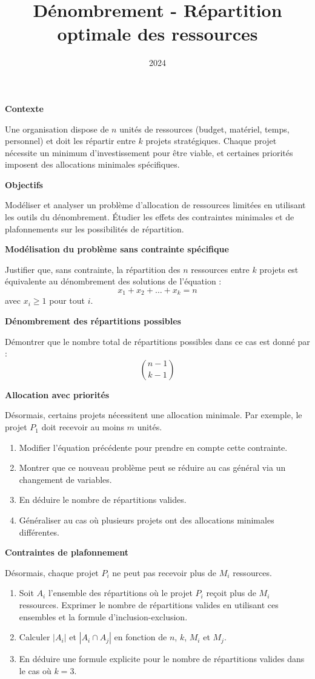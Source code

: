 \documentclass[10pt,a4paper]{article}
\title{Dénombrement - Répartition optimale des ressources}
\author{}
\date{2024}
\begin{document}
\textbf{Contexte}

Une organisation dispose de \textbf{\( n \)} unités de ressources (budget, matériel, temps,
personnel) et doit les répartir entre \textbf{\( k \)} projets stratégiques. Chaque projet nécessite
un minimum d'investissement pour être viable, et certaines priorités imposent des allocations
minimales spécifiques.

\textbf{Objectifs}

Modéliser et analyser un problème d'allocation de ressources limitées en utilisant les outils du
dénombrement. Étudier les effets des contraintes minimales et de plafonnements sur les possibilités
de répartition.

\q \textbf{Modélisation du problème sans contrainte spécifique}

   Justifier que, sans contrainte, la répartition des \( n \) ressources entre \( k \) projets est
   équivalente au dénombrement des solutions de l'équation :
   \[
   x_1 + x_2 + \dots + x_k = n
   \]
   avec \( x_i \geq 1 \) pour tout \( i \).

\q \textbf{Dénombrement des répartitions possibles}

   Démontrer que le nombre total de répartitions possibles dans ce cas est donné par :
   \[
   \binom{n-1}{k-1}
   \]

\q \textbf{Allocation avec priorités}

   Désormais, certains projets nécessitent une allocation minimale. Par exemple, le projet \( P_1 \)
   doit recevoir au moins $m$ unités.

   \begin{enumerate}
       \item Modifier l'équation précédente pour prendre en compte cette contrainte.
       \item Montrer que ce nouveau problème peut se réduire au cas général via un changement de
       variables.
       \item En déduire le nombre de répartitions valides.
       \item Généraliser au cas où plusieurs projets ont des allocations minimales différentes.
   \end{enumerate}

\q \textbf{Contraintes de plafonnement}

   Désormais, chaque projet $P_i$ ne peut pas recevoir plus de $M_i$ ressources.

   \begin{enumerate}
      \item Soit $A_i$ l'ensemble des répartitions où le projet $P_i$ reçoit plus de $M_i$
      ressources. Exprimer le nombre de répartitions valides en utilisant ces ensembles et la
      formule d'inclusion-exclusion.
      \item Calculer $|A_i|$ et $|A_i \cap A_j|$ en fonction de $n$, $k$, $M_i$ et $M_j$.
      \item En déduire une formule explicite pour le nombre de répartitions valides dans le cas où
      $k=3$.
   \end{enumerate}
\end{document}
